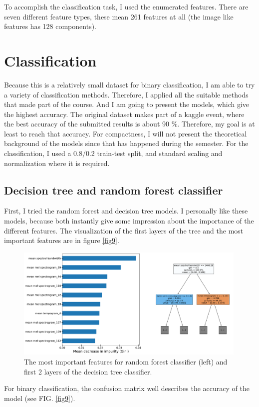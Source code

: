 \documentclass[12pt a4paper]{article}
\numberwithin{equation}{section}
\begin{document}
To accomplish the classification task, I used the enumerated features. There are seven different feature types, these mean 261 features at all (the image like features has 128 components).

\section{Classification}

Because this is a relatively small dataset for binary classification, I am able to try a variety of classification methods. Therefore,  I applied all the suitable methods that made part of the course. And I am going to present the models, which give the highest accuracy. The original dataset makes part of a kaggle event, where the best accuracy of the submitted results is about 90 \%. Therefore, my goal is at least to reach that accuracy. For compactness, I will not present the theoretical background of the models since that has happened during the semester. For the classification, I used a 0.8/0.2 train-test split, and standard scaling and normalization where it is required.

\subsection{Decision tree and random forest classifier}

First, I tried the random forest and decision tree models. I personally like these models, because both instantly give some impression about the importance of the different features. The visualization of the first layers of the tree and the most important features are in figure \ref{fig9}.

\begin{figure}[H]
\centering
\includegraphics[width=0.99\textwidth]{fig/features.pdf}
\caption{The most important features for random forest classifier (left) and first 2 layers of the decision tree classifier.}
\label{fig8}
\end{figure}
For binary classification, the confusion matrix well describes the accuracy of the model (see FIG.  \ref{fig9}).
\end{document}
